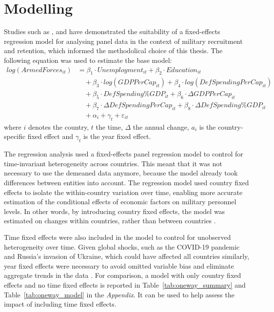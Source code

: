 \section{Modelling}

Studies such as \textcite{asch_cash_2010}, \textcite{backstrom_are_2019} and 
\textcite{balcaen_unemployment_2025} have demonstrated the suitability of a fixed-effects 
regression model for analysing panel data in the context of military recruitment and retention, 
which informed the methodolical choice of this thesis.
The following equation was used to estimate the base model:
\begin{align*}
log(ArmedForces_{it}) &= \beta_1 \cdot Unemployment_{it} 
+ \beta_2 \cdot Education_{it} \\
&\quad + \beta_3 \cdot log(GDPPerCap_{it}) 
+ \beta_4 \cdot log(DefSpendingPerCap_{it}) \\
&\quad + \beta_5 \cdot DefSpending\%GDP_{it} 
+ \beta_6 \cdot \Delta GDPPerCap_{it} \\
&\quad + \beta_7 \cdot \Delta DefSpendingPerCap_{it} 
+ \beta_8 \cdot \Delta DefSpending\%GDP_{it} \\
&\quad + \alpha_i + \gamma_t + \varepsilon_{it}
\end{align*}
where $i$ denotes the country, $t$ the time, $\Delta$ the annual change,
$a_i$ is the country-specific fixed effect and $\gamma_t$ is the year fixed effect.

The regression analysis used a fixed-effects panel regression model to control for time-invariant 
heterogeneity across countries. This meant that it was not 
necessary to use the demeaned data anymore, 
because the model already took differences between entities into account.
The regression model used country fixed effects to isolate the within-country variation over time, 
enabling more accurate 
estimation of the conditional effects of economic factors on military personnel levels.
In other words, by introducing country fixed effects, the model was estimated on changes within 
countries, rather than between countries \parencite{backstrom_are_2019}.

Time fixed effects were also included in the model to control for unobserved heterogeneity
over time. Given global shocks, such as the COVID-19 pandemic and Russia's invasion of 
Ukraine, which could have affected all countries similarly, year fixed effects were 
necessary to avoid omitted variable bias and eliminate aggregate trends in the data \parencite{backstrom_are_2019}.
For comparison, a model with only country fixed effects and no time fixed effects
is reported in Table~\ref{tab:oneway_summary} and Table~\ref{tab:oneway_model} in 
the \textit{Appendix}.
It can be used to help assess the impact of including time fixed effects.

